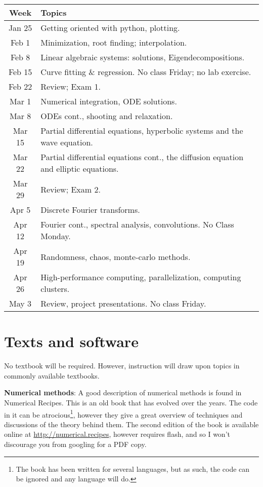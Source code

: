 \documentclass[11pt]{article}
\begin{document}
\begin{center}
 \begin{tabularx}{\textwidth}{ c X } 
 Week & Topics \\
 \hline\hline
 Jan 25 & Getting oriented with python, plotting. \\ 
 Feb 1 & Minimization, root finding; interpolation. \\
 Feb 8 & Linear algebraic systems: solutions, Eigendecompositions. \\
 Feb 15 & Curve fitting \& regression. No class Friday; no lab exercise. \\
 Feb 22 & Review; Exam 1. \\
 Mar 1 & Numerical integration, ODE solutions. \\ %
 Mar 8 & ODEs cont., shooting and relaxation. \\ %
 Mar 15 & Partial differential equations, hyperbolic systems and the wave equation. \\
 Mar 22 & Partial differential equations cont., the diffusion equation and elliptic equations. \\
 Mar 29 & Review; Exam 2. \\
 Apr 5 & Discrete Fourier transforms. \\
 Apr 12 & Fourier cont., spectral analysis, convolutions. No Class Monday. \\
 Apr 19 & Randomness, chaos, monte-carlo methods. \\ %
 Apr 26 & High-performance computing, parallelization, computing clusters. \\ %
 May 3 &  Review, project presentations. No class Friday.  \\
\end{tabularx}
\end{center}


\section*{Texts and software}

No textbook will be required. However, instruction will draw upon topics in commonly available textbooks.

{\bf Numerical methods}: A good description of numerical methods is found in Numerical Recipes. This is an old book that has evolved over the years. The code in it can be atrocious\footnote{The book has been written for several languages, but as such, the code can be ignored and any language will do.}, however they give a great overview of techniques and discussions of the theory behind them. The second edition of the book is available online at \href{http://numerical.recipes/}{http://numerical.recipes}, however requires flash, and so I won't discourage you from googling for a PDF copy.
\end{document}
